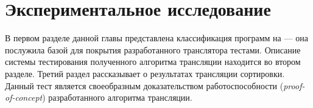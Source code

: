 \section{Экспериментальное исследование}
\label{test}

В первом разделе данной главы представлена классификация программ на \miniKanren{} --- она послужила базой для покрытия разработанного транслятора тестами.
Описание системы тестирования полученного алгоритма трансляции находится во втором разделе.
Третий раздел рассказывает о результатах трансляции сортировки.
Данный тест является своеобразным доказательством работоспособности (\emph{proof-of-concept}) разработанного алгоритма трансляции.




